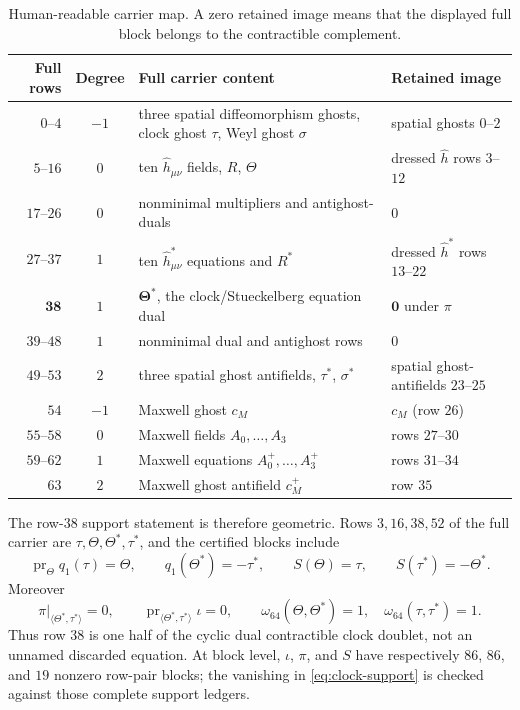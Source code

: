 \documentclass[11pt]{article}
\theoremstyle{definition}
\theoremstyle{remark}
\newcommand{\pr}{\operatorname{pr}}
\begin{document}
\begin{table}[ht]
\centering
\caption{Human-readable carrier map.  A zero retained image means that the
displayed full block belongs to the contractible complement.}
\label{tab:carriers}
\scriptsize
\begin{tabularx}{\textwidth}{@{}r c Y Y@{}}
\toprule
Full rows & Degree & Full carrier content & Retained image\\
\midrule
$0$--$4$ & $-1$ & three spatial diffeomorphism ghosts,
clock ghost $\tau$, Weyl ghost $\sigma$ & spatial ghosts $0$--$2$\\
$5$--$16$ & $0$ & ten $\widehat h_{\mu\nu}$ fields, $R$, $\Theta$
 & dressed $\widehat h$ rows $3$--$12$\\
$17$--$26$ & $0$ & nonminimal multipliers and antighost-duals & $0$\\
$27$--$37$ & $1$ & ten $\widehat h^*_{\mu\nu}$ equations and $R^*$
 & dressed $\widehat h^*$ rows $13$--$22$\\
$\mathbf{38}$ & $1$ & $\boldsymbol{\Theta^*}$, the clock/Stueckelberg
equation dual & $\boldsymbol{0}$ under $\pi$\\
$39$--$48$ & $1$ & nonminimal dual and antighost rows & $0$\\
$49$--$53$ & $2$ & three spatial ghost antifields, $\tau^*$,
$\sigma^*$ & spatial ghost-antifields $23$--$25$\\
$54$ & $-1$ & Maxwell ghost $c_M$ & $c_M$ (row $26$)\\
$55$--$58$ & $0$ & Maxwell fields $A_0,\ldots,A_3$ & rows $27$--$30$\\
$59$--$62$ & $1$ & Maxwell equations $A^+_0,\ldots,A^+_3$
 & rows $31$--$34$\\
$63$ & $2$ & Maxwell ghost antifield $c_M^+$ & row $35$\\
\bottomrule
\end{tabularx}
\end{table}

The row-$38$ support statement is therefore geometric.  Rows $3,16,38,52$
of the full carrier are $\tau,\Theta,\Theta^*,\tau^*$, and the certified
blocks include
\begin{equation}\label{eq:clock-doublet}
 \pr_{\Theta}q_1(\tau)=\Theta,\qquad
 q_1(\Theta^*)=-\tau^*,\qquad
 S(\Theta)=\tau,\qquad S(\tau^*)=-\Theta^*.
\end{equation}
Moreover
\begin{equation}\label{eq:clock-support}
 \pi\big|_{\langle\Theta^*,\tau^*\rangle}=0,\qquad
 \pr_{\langle\Theta^*,\tau^*\rangle}\iota=0,\qquad
 \omega_{64}(\Theta,\Theta^*)=1,\quad
 \omega_{64}(\tau,\tau^*)=1.
\end{equation}
Thus row $38$ is one half of the cyclic dual contractible clock doublet, not
an unnamed discarded equation.  At block level, $\iota$, $\pi$, and $S$ have
respectively $86$, $86$, and $19$ nonzero row-pair blocks; the vanishing in
\eqref{eq:clock-support} is checked against those complete support ledgers.
\end{document}
